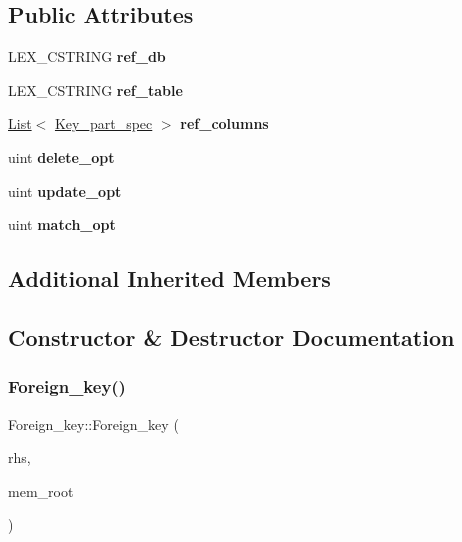 \subsection*{Public Attributes}
\begin{DoxyCompactItemize}
\item 
\mbox{\label{classForeign__key_a487f44364147bc8c33a2d69fb43b0332}} 
L\+E\+X\+\_\+\+C\+S\+T\+R\+I\+NG {\bfseries ref\+\_\+db}
\item 
\mbox{\label{classForeign__key_a9433d72dd2e283a4445f06446fde3fde}} 
L\+E\+X\+\_\+\+C\+S\+T\+R\+I\+NG {\bfseries ref\+\_\+table}
\item 
\mbox{\label{classForeign__key_a5b74193e7ccb8bac4d5ff02e632bfebb}} 
\mbox{\hyperlink{classList}{List}}$<$ \mbox{\hyperlink{classKey__part__spec}{Key\+\_\+part\+\_\+spec}} $>$ {\bfseries ref\+\_\+columns}
\item 
\mbox{\label{classForeign__key_a64db5dcf8783f1114d7c9ee5b6c7dc7a}} 
uint {\bfseries delete\+\_\+opt}
\item 
\mbox{\label{classForeign__key_a95efa38e1bb38a1a4d1c6f4fea564734}} 
uint {\bfseries update\+\_\+opt}
\item 
\mbox{\label{classForeign__key_a4fd5f5fea18496c0e13bc1d2fee7c3a6}} 
uint {\bfseries match\+\_\+opt}
\end{DoxyCompactItemize}
\subsection*{Additional Inherited Members}


\subsection{Constructor \& Destructor Documentation}
\mbox{\label{classForeign__key_acf9cdeeea91492a4d40dbd34082391e8}} 
\subsubsection{\texorpdfstring{Foreign\+\_\+key()}{Foreign\_key()}}
{\footnotesize\ttfamily Foreign\+\_\+key\+::\+Foreign\+\_\+key (\begin{DoxyParamCaption}\item[{const \mbox{\hyperlink{classForeign__key}{Foreign\+\_\+key}} \&}]{rhs,  }\item[{M\+E\+M\+\_\+\+R\+O\+OT $\ast$}]{mem\+\_\+root }\end{DoxyParamCaption})}

